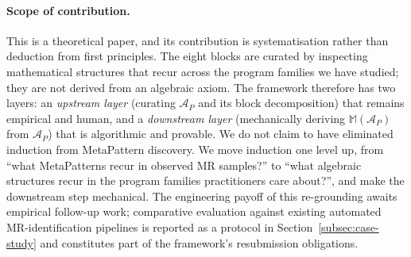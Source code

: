 \documentclass[acmsmall, screen]{acmart}
\begin{document}
\paragraph{Scope of contribution.} This is a theoretical paper, and its contribution is systematisation rather than deduction from first principles. The eight blocks are curated by inspecting mathematical structures that recur across the program families we have studied; they are not derived from an algebraic axiom. The framework therefore has two layers: an \emph{upstream layer} (curating $\mathcal{A}_P$ and its block decomposition) that remains empirical and human, and a \emph{downstream layer} (mechanically deriving $\mathbb{M}(\mathcal{A}_P)$ from $\mathcal{A}_P$) that is algorithmic and provable. We do not claim to have eliminated induction from MetaPattern discovery. We move induction one level up, from ``what MetaPatterns recur in observed MR samples?'' to ``what algebraic structures recur in the program families practitioners care about?'', and make the downstream step mechanical. The engineering payoff of this re-grounding awaits empirical follow-up work; comparative evaluation against existing automated MR-identification pipelines is reported as a protocol in Section~\ref{subsec:case-study} and constitutes part of the framework's resubmission obligations.
\end{document}
